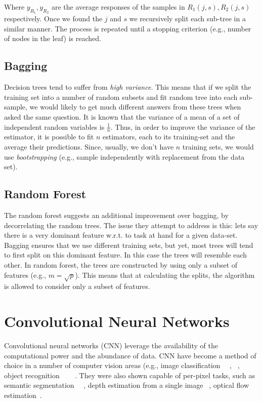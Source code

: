 Where $y_{R_1}, y_{R_2}$ are the average responses of the samples in
$R_1(j,s), R_2(j,s)$ respectively.  Once we found the $j$ and $s$ we
recursively split each sub-tree in a similar manner.  The process is
repeated until a stopping criterion (e.g., number of nodes in the
leaf) is reached.

\subsection{Bagging}
Decision trees tend to suffer from \textit{high variance}. This means
that if we split the training set into a number of random subsets and
fit random tree into each sub-sample, we would likely to get much
different answers from these trees when asked the same question.  It
is known that the variance of a mean of a set of independent random
variables is $\frac{1}{n}$.  Thus, in order to improve the variance of
the estimator, it is possible to fit $n$ estimators, each to its
training-set and the average their predictions.  Since, usually, we
don't have $n$ training sets, we would use \textit{bootstrapping}
(e.g., sample independently with replacement from the data set).

\subsection{Random Forest}
The random forest suggests an additional improvement over bagging, by
decorrelating the random trees.  The issue they attempt to address is
this: lets say there is a very dominant feature w.r.t. to task at hand
for a given data-set.  Bagging ensures that we use different training
sets, but yet, most trees will tend to first split on this dominant
feature.  In this case the trees will resemble each other.  In random
forest, the trees are constructed by using only a subset of features
(e.g., $m = \sqrt{p}$).  This means that at calculating the splits,
the algorithm is allowed to consider only a subset of features.

\section{Convolutional Neural Networks}

Convolutional neural networks (CNN) leverage the availability of the
computational power and the abundance of data.  CNN have become a
method of choice in a number of computer vision areas (e.g., image
classification~\cite{krizhevsky2012imagenet} ~\cite{simonyan2014very},
~\cite{szegedy2015going}, object recognition
~\cite{sermanet2013overfeat}~\cite{girshick2014rich}
~\cite{he2014spatial}.  They were also shown capable of per-pixel
tasks, such as semantic segmentation
~\cite{ning2005toward}~\cite{gupta2014learning}, depth estimation from
a single image ~\cite{liu2016learning}, optical flow
estimation~\cite{fischer2015flownet}.

